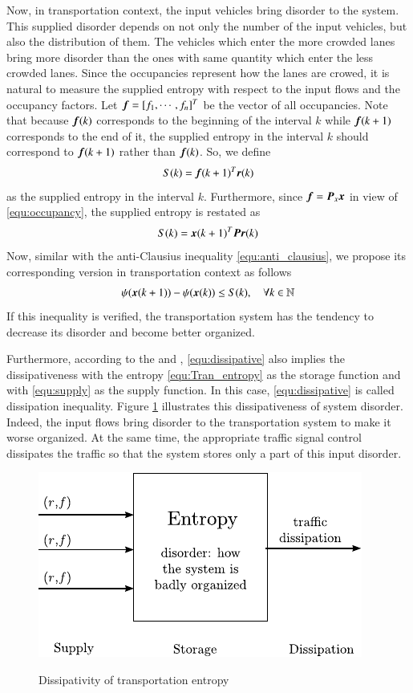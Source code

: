 \documentclass[preprint,authoryear,12pt]{elsarticle}
\renewcommand{\vec}[1]{\mbox{\boldmath$#1$}}
\newcommand{\mat}[1]{\mbox{\boldmath$#1$}}
\begin{document}
Now, in transportation context, the input vehicles bring disorder to the system. This supplied disorder depends on not only the number of the input vehicles, but also the distribution of them. The vehicles which enter the more crowded lanes bring more disorder than the ones with same quantity which enter the less crowded lanes. Since the occupancies represent how the lanes are crowed, it is natural to measure the supplied entropy with respect to the input flows and the occupancy factors. Let $\vec{f}=[f_1,\cdots,f_n]^T$ be the vector of all occupancies. Note that because $\vec{f}(k)$ corresponds to the beginning of the interval $k$ while $\vec{f}(k+1)$ corresponds to the end of it, the supplied entropy in the interval $k$ should correspond to $\vec{f}(k+1)$ rather than $\vec{f}(k)$. So, we define
$$S(k)=\vec{f}(k+1)^T\vec{r}(k)$$
as the supplied entropy in the interval $k$. Furthermore, since $\vec{f}=\mat{P}_x\vec{x}$ in view of \eqref{equ:occupancy}, the supplied entropy is restated as
\begin{equation}\label{equ:supply}
    S(k)=\vec{x}(k+1)^T \mat{P} \vec{r}(k)
\end{equation}
Now, similar with the anti-Clausius inequality \eqref{equ:anti_clausius}, we propose its corresponding version in transportation context as follows
\begin{equation}\label{equ:dissipative}
\psi(\vec{x}(k+1))-\psi(\vec{x}(k)) \leq S(k),\quad \forall
k\in\mathbb{N}
\end{equation}
If this inequality is verified, the transportation system has the tendency to decrease its disorder and become better organized.

Furthermore, according to the \citet{willems_dissipative_1972} and \citet{hill_dissipative_1980}, \eqref{equ:dissipative} also implies the dissipativeness with the entropy \eqref{equ:Tran_entropy} as the storage function and with \eqref{equ:supply} as the supply function. In this case, \eqref{equ:dissipative} is called dissipation inequality. Figure \ref{fig:trans_dis} illustrates this dissipativeness of system disorder. Indeed, the input flows bring disorder to the transportation system to make it worse organized. At the same time, the appropriate traffic signal control dissipates the traffic so that the system stores only a part of this input disorder.
\begin{figure}[ht]
  \centering
  \includegraphics{pics/trans_dis}\\
  \caption{Dissipativity of transportation entropy}
  \label{fig:trans_dis}
\end{figure}
\end{document}
